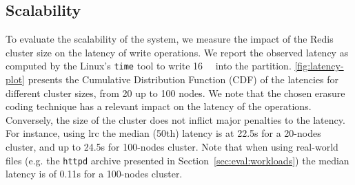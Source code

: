 %

\subsection{Scalability}
\label{subsec:latency}
To evaluate the scalability of the system, we measure the impact of the Redis cluster size on the latency of write operations.
We report the observed latency as computed by the Linux's \texttt{time} tool to write \SI{16}{\mebi\byte} into the \SYS partition.
\autoref{fig:latency-plot} presents the Cumulative Distribution Function (CDF) of the latencies for different cluster sizes, from 20 up to 100 nodes.
We note that the chosen erasure coding technique has a relevant impact on the latency of the operations. 
Conversely, the size of the cluster does not inflict major penalties to the latency.
For instance, using \ac{lrc} the median (50th) latency is at 22.5s for a 20-nodes cluster, and up to 24.5s for 100-nodes cluster. 
Note that when using real-world files (e.g. the \texttt{httpd} archive presented in Section~\ref{sec:eval:workloads}) the median latency is of 0.11s for a 100-nodes cluster. 

